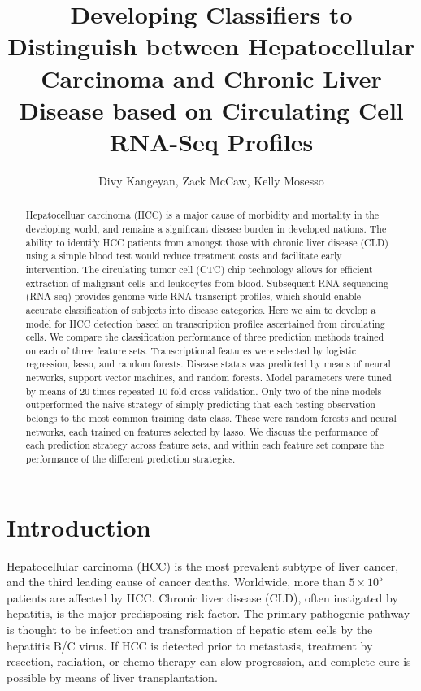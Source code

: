 \documentclass[a4paper]{article}
\title{Developing Classifiers to Distinguish between Hepatocellular Carcinoma and Chronic Liver Disease based on Circulating Cell RNA-Seq Profiles}
\author{Divy Kangeyan, Zack McCaw, Kelly Mosesso}
\begin{document}
\maketitle

\begin{abstract}
Hepatocelluar carcinoma (HCC) is a major cause of morbidity and mortality in the developing world, and remains a significant disease burden in developed nations. The ability to identify HCC patients from amongst those with chronic liver disease (CLD) using a simple blood test would reduce treatment costs and facilitate early intervention. The circulating tumor cell (CTC) chip technology allows for efficient extraction of malignant cells and leukocytes from blood. Subsequent RNA-sequencing (RNA-seq) provides genome-wide RNA transcript profiles, which should enable accurate classification of subjects into disease categories. Here we aim to develop a model for HCC detection based on transcription profiles ascertained from circulating cells. We compare the classification performance of three prediction methods trained on each of three feature sets. Transcriptional features were selected by logistic regression, lasso, and random forests. Disease status was predicted by means of neural networks, support vector machines, and random forests. Model parameters were tuned by means of 20-times repeated 10-fold cross validation. Only two of the nine models outperformed the naive strategy of simply predicting that each testing observation belongs to the most common training data class. These were random forests and neural networks, each trained on features selected by lasso. We discuss the performance of each prediction strategy across feature sets, and within each feature set compare the performance of the different prediction strategies. 
\end{abstract}

\section{Introduction}

	Hepatocellular carcinoma (HCC) is the most prevalent subtype of liver cancer, and the third leading cause of cancer deaths. Worldwide, more than $5 \times 10^{5}$ patients are affected by HCC. Chronic liver disease (CLD), often instigated by hepatitis, is the major predisposing risk factor. The primary pathogenic pathway is thought to be infection and transformation of hepatic stem cells by the hepatitis B/C virus. If HCC is detected prior to metastasis, treatment by resection, radiation, or chemo-therapy can slow progression, and complete cure is possible by means of liver transplantation. 
	
\end{document}
